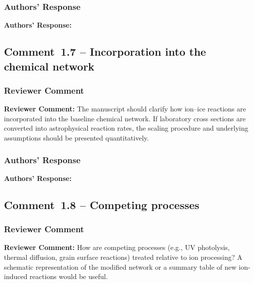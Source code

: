 \documentclass[12pt]{article}
\newcommand{\reviewlabel}{\textbf{\textcolor{commentframe}{Reviewer Comment:}}}
\newcommand{\responselabel}{\textbf{\textcolor{responseframe}{Authors' Response:}}}
\begin{document}
\subsubsection{Authors' Response}
\begin{responsebox}
\responselabel{}

\end{responsebox}

\subsection{Comment~1.7 -- Incorporation into the chemical network}

\subsubsection{Reviewer Comment}
\begin{reviewerbox}
\reviewlabel{} The manuscript should clarify how ion--ice reactions are
incorporated into the baseline chemical network. If laboratory cross sections
are converted into astrophysical reaction rates, the scaling procedure and
underlying assumptions should be presented quantitatively.
\end{reviewerbox}

\subsubsection{Authors' Response}
\begin{responsebox}
\responselabel{}

\end{responsebox}

\subsection{Comment~1.8 -- Competing processes}

\subsubsection{Reviewer Comment}
\begin{reviewerbox}
\reviewlabel{} How are competing processes (e.g., UV photolysis, thermal
diffusion, grain surface reactions) treated relative to ion processing? A
schematic representation of the modified network or a summary table of new
ion-induced reactions would be useful.
\end{reviewerbox}
\end{document}
